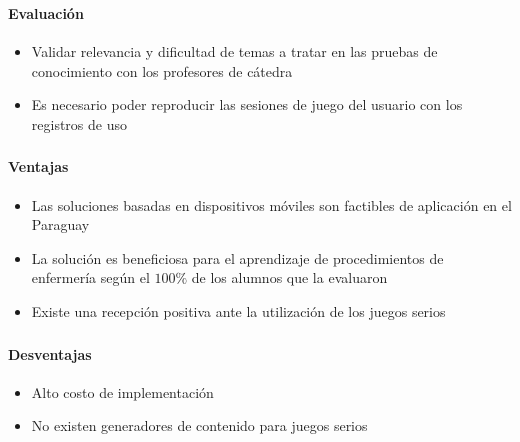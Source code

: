 \begin{frame}
\frametitle{\pagetitle}
\framesubtitle{Evaluación}
\begin{itemize}[<+->]

\item Validar relevancia y dificultad de temas a tratar en las pruebas de conocimiento 
con los profesores de cátedra

\item Es necesario poder reproducir las sesiones de juego del usuario con los
registros de uso

\end{itemize}
\end{frame}

\begin{frame}
\frametitle{\pagetitle}
\framesubtitle{Ventajas}
\begin{itemize}[<+->]


\item Las soluciones basadas en dispositivos móviles son factibles de aplicación en el Paraguay

\item La solución es beneficiosa para el aprendizaje de procedimientos de enfermería según el $100\%$ de los alumnos que la evaluaron


\item Existe una recepción positiva ante la utilización de los juegos serios


\end{itemize}
\end{frame}

\begin{frame}
\frametitle{\pagetitle}
\framesubtitle{Desventajas}
\begin{itemize}[<+->]

\item Alto costo de implementación

\item No existen generadores de contenido para juegos serios



\end{itemize}
\end{frame}
